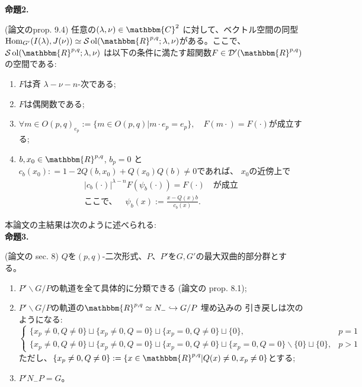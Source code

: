 \documentclass[a4paper]{article} %
\newcommand{\assign}{:=}
\newcommand{\tmop}[1]{\ensuremath{\operatorname{#1}}}
\newcommand{\tmtextbf}[1]{{\bfseries{#1}}}
\newcommand{\tmtextit}[1]{{\itshape{#1}}}
\begin{document}
{\noindent}\textbf{命題\textbf{2}.}\tmtextit{(論文のprop. 9.4)
任意の$( \lambda, \nu) \in \mathbbm{C}^2$ に対して、ベクトル空間の同型 $\tmop{Hom}_{G'} ( I (
\lambda), J ( \nu)) \simeq \mathcal{S} \tmop{ol} ( \mathbbm{R}^{p, q} ;
\lambda, \nu)$がある。ここで、$\mathcal{S} \tmop{ol} ( \mathbbm{R}^{p, q} ; \lambda,
\nu)$ は以下の条件に満たす超関数$F \in \mathcal{D}' (
\mathbbm{R}^{p, q})$の空間である:
\begin{enumerate}
 \item $F$は斉 $\lambda-\nu-n$-次である;
 \item $F$は偶関数である;
\item $\forall m \in O ( p, q)_{e_p} \assign \{ m \in O ( p, q) | m \cdot e_p = e_p \},\quad F ( m \cdot) = F ( \cdot)$が成立する;
 \item $b, x_0 \in \mathbbm{R}^{p, q}$, $b_p = 0$ と $c_b
 ( x_0) : = 1 - 2 Q ( b, x_0) + Q ( x_0) Q ( b) \neq 0$であれば、 $x_0$の近傍上で
\begin{eqnarray}
& | c_b ( \cdot) |^{\lambda - n} F ( \psi_b ( \cdot)) = F (\cdot)
\quad　\mbox{が成立}& \nonumber\\
& \mbox{ここで、}\quad\psi_b ( x) \assign \frac{x - Q (x) b}{c_b ( x)} . & \nonumber
\end{eqnarray}
\end{enumerate}}

{\noindent}本論文の主結果は次のように述べられる:\\

{\noindent}\tmtextbf{命題\textbf{3}.}\tmtextit{(論文の sec. 8)
$Q$を$(p,q)$-二次形式、$P、P'$を$G,G'$の最大双曲的部分群とする。
\begin{enumerate}
 \item $P' \backslash G/ P$の軌道を全て具体的に分類できる (論文の
prop. 8.1);
 \item $P' \backslash G/P$の軌道の$\mathbbm{R}^{p, q} \simeq N_- \hookrightarrow G / P$ 埋め込みの
引き戻しは次のようになる:
 \[ \left\{ \begin{array}{ll}
 \{ x_p \neq 0, Q \neq 0 \} \sqcup \{ x_p \neq 0, Q = 0 \} \sqcup \{ x_p
 = 0, Q \neq 0 \} \sqcup \{ 0 \}, & p = 1\\
 \{ x_p \neq 0, Q \neq 0 \} \sqcup \{ x_p \neq 0, Q = 0 \} \sqcup \{ x_p
 = 0, Q \neq 0 \} \sqcup \{ x_p = 0, Q = 0 \} \backslash \{ 0 \} \sqcup
 \{ 0 \}, & p > 1
 \end{array} \right. \]
 ただし、$\{ x_p \neq 0, Q \neq 0 \} \assign \{ x \in \mathbbm{R}^{p, q} |
 Q ( x) \neq 0, x_p \neq 0 \}$とする;
 
 \item $P' N_- P = G$。
\end{enumerate}}
\end{document}
